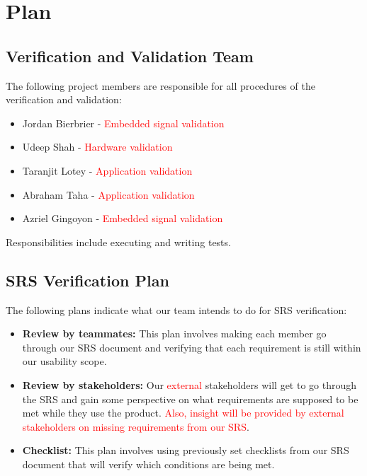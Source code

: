 \documentclass[12pt, titlepage]{article}
\begin{document}
\section{Plan}


\subsection{Verification and Validation Team}

The following project members are responsible for all procedures of the verification and validation:
\begin{itemize}
    \item Jordan Bierbrier  - \textcolor{red}{Embedded signal validation}
    \item Udeep Shah - \textcolor{red}{Hardware validation}
    \item Taranjit Lotey - \textcolor{red}{Application validation}
    \item Abraham Taha - \textcolor{red}{Application validation}
    \item Azriel Gingoyon - \textcolor{red}{Embedded signal validation}
\end{itemize}

\noindent Responsibilities include executing and writing tests.

\subsection{SRS Verification Plan}

The following plans indicate what our team intends to do for SRS verification:
\begin{itemize}
    \item \textbf{Review by teammates:} This plan involves making each member go through our SRS document and verifying that each requirement is still within our usability scope.
    \item \textbf{Review by stakeholders:} Our \textcolor{red}{external} stakeholders will get to go through the SRS and gain some perspective on what requirements are supposed to be met while they use the product. \textcolor{red}{Also, insight will be provided by external stakeholders on missing requirements from our SRS}.
    \item \textbf{Checklist:} This plan involves using previously set checklists from our SRS document that will verify which conditions are being met.
\end{itemize}
\end{document}
